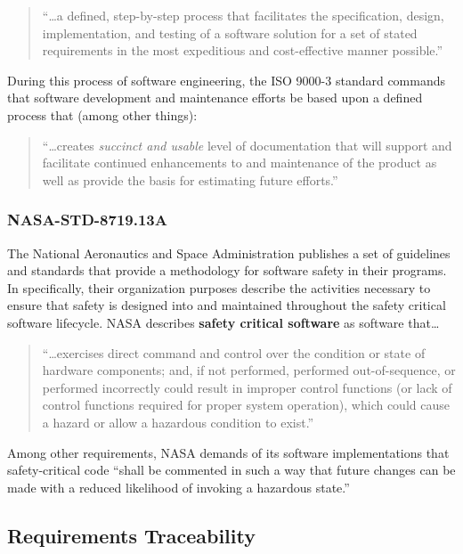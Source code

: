 \begin{quote}
``\ldots a defined, step-by-step process that facilitates the specification,
design, implementation, and testing of a software solution for a set of stated
requirements in the most expeditious and cost-effective manner possible.''
\cite{Kehoe1996}
\end{quote}

During this process of software engineering, the ISO 9000-3 standard commands
that software development and maintenance efforts be based upon a defined
process that (among other things): 

\begin{quote}
``\ldots creates \textit{succinct and usable} level of documentation that will
support and facilitate continued enhancements to and maintenance of the product
as well as provide the basis for estimating future efforts.'' \cite{Kehoe1996}
\end{quote}

\subsubsection{NASA-STD-8719.13A}
The National Aeronautics and Space Administration publishes a set of guidelines
and standards that provide a methodology for software safety in their programs.
In \cite{NASA1997} specifically, their organization purposes describe the
activities necessary to ensure that safety is designed into and maintained
throughout the safety critical software lifecycle. NASA describes \textbf{safety
critical software} as software that\ldots

\begin{quote} 
``\ldots exercises direct command and control over the condition or state of
hardware components; and, if not performed, performed out-of-sequence, or
performed incorrectly could result in improper control functions (or lack of
control functions required for proper system operation), which could cause a
hazard or allow a hazardous condition to exist.'' \cite{NASA1997}
\end{quote}

Among other requirements, NASA demands of its software implementations that
safety-critical code ``shall be commented in such a way that future changes can
be made with a reduced likelihood of invoking a hazardous state.''

\subsection{Requirements Traceability}
